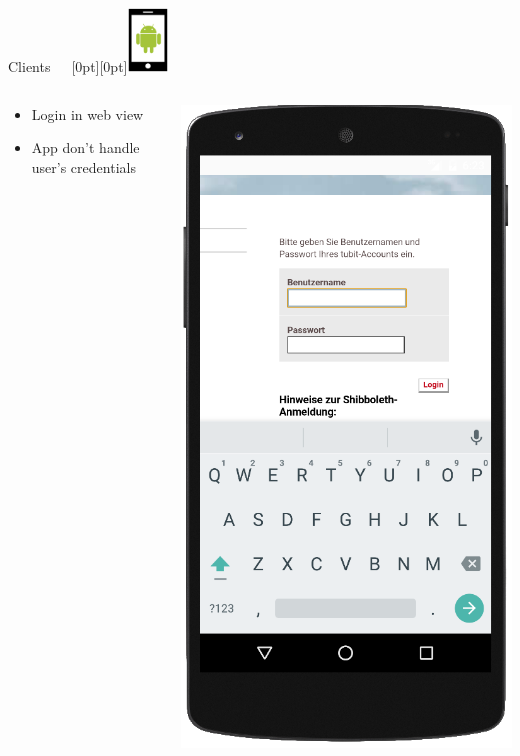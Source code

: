 \documentclass[11pt]{beamer}
\begin{document}
\begin{frame}{Clients~~~\raisebox{-10pt}[0pt][0pt]{\includegraphics[width=0.08\textwidth]{tech-stack-android}}}

\begin{columns}[T]
	\begin{column}{.6\textwidth}
	\begin{itemize}
		\item Login in web view
		\item App don't handle user's credentials
	\end{itemize}
	\end{column}
	\begin{column}{.4\textwidth}
	\includegraphics[scale=0.27]{android_login}

\end{column}
\end{columns}
\end{frame}
\end{document}
